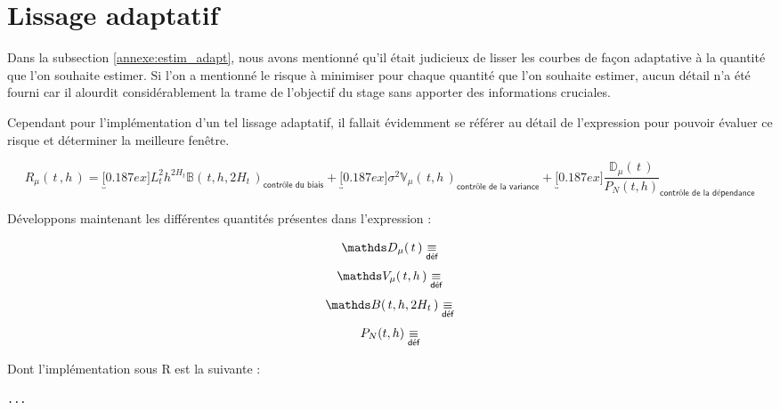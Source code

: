 \section{Lissage adaptatif}

Dans la subsection \ref{annexe:estim_adapt}, nous avons mentionné qu'il était judicieux de lisser les courbes de façon adaptative à la quantité que l'on souhaite estimer. Si l'on a mentionné le risque à minimiser pour chaque quantité que l'on souhaite estimer, aucun détail n'a été fourni car il alourdit considérablement la trame de l'objectif du stage sans apporter des informations cruciales.

\bigskip

Cependant pour l'implémentation d'un tel lissage adaptatif, il fallait évidemment se référer au détail de l'expression pour pouvoir évaluer ce risque et déterminer la meilleure fenêtre.

\bigskip

\begin{equation*}
    R_\mu( \, t \, , h \, ) =
    \underbracket[0.187ex]{L_t^2 h ^{2H_t} \mathds B( \, t, h, 2H_t \,) }_{\textsf{contrôle du biais}}
    + \underbracket[0.187ex]{\sigma^2 \mathds V_\mu( \, t, h \, ) }_{\textsf{contrôle de la variance}}
    + \underbracket[0.187ex]{\frac{\mathds D_\mu( \, t \, )}{P_N(t, h)}}_{\textsf{contrôle de la dépendance}}
\end{equation*}

Développons maintenant les différentes quantités présentes dans l'expression :

\begin{equation*}
    {\mathds D_\mu( \, t \, )} \isdef
\end{equation*}
\begin{equation*}
    \mathds V_\mu( \, t, h \, ) \isdef
\end{equation*}
\begin{equation*}
    \mathds B( \, t, h, 2H_t \,) \isdef
\end{equation*}
\begin{equation*}
    P_N(t, h) \isdef
\end{equation*}

Dont l'implémentation sous R est la suivante :

\begin{verbatim}
...
\end{verbatim}
\fi
